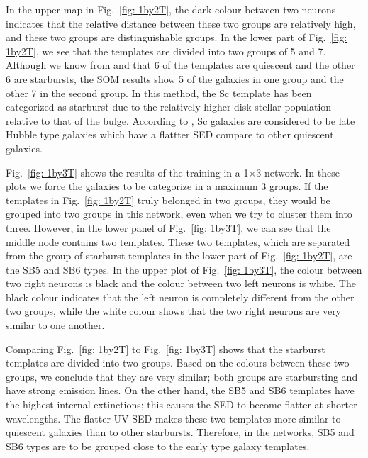         
            In the upper map in Fig.~\ref{fig: 1by2T}, the dark colour between two neurons indicates that the relative distance between these two groups are relatively high, and these two groups are distinguishable groups.
            In the lower part of Fig.~\ref{fig: 1by2T}, we see that the templates are divided into two groups of 5 and 7.
            Although we know from  and  that 6 of the templates are quiescent and the other 6 are starbursts, the SOM results show 5 of the galaxies in one group and the other 7 in the second group.
            In this method, the Sc template has been categorized as starburst due to the relatively higher disk stellar population relative to that of the bulge. 
            According to , Sc galaxies are considered to be late Hubble type galaxies which have a flattter SED compare to other quiescent galaxies. 
            

            Fig.~\ref{fig: 1by3T} shows the results of the training in a 1$\times$3 network.
            In these plots we force the galaxies to be categorize in a maximum 3 groups. 
            If the templates in Fig.~\ref{fig: 1by2T} truly belonged in two groups, they would be grouped into two groups in this network, even when we try to cluster them into three. 
            However, in the lower panel of Fig.~\ref{fig: 1by3T}, we can see that the middle node contains two templates.
            These two templates, which are separated from the group of starburst templates in the lower part of Fig.~\ref{fig: 1by2T},  are the SB5 and SB6 types.
            In the upper plot of Fig.~\ref{fig: 1by3T}, the colour between two right neurons is black and the colour between two left neurons is white. 
            The black colour indicates that the left neuron is completely different from the other two groups,
            while the white colour shows that the two right neurons are very similar to one another. 
            
            Comparing Fig.~\ref{fig: 1by2T} to Fig.~\ref{fig: 1by3T} shows that the starburst templates are divided into two groups. 
            Based on the colours between these two groups, we conclude that they are very similar; both groups are starbursting and have strong emission lines.
            On the other hand, the SB5 and SB6 templates have the highest internal extinctions; this causes the SED to become flatter at shorter wavelengths. 
            The flatter UV SED makes these two templates more similar to quiescent galaxies than to other starbursts.
            Therefore, in the networks, SB5 and SB6 types are to be grouped close to the early type galaxy templates.
                
